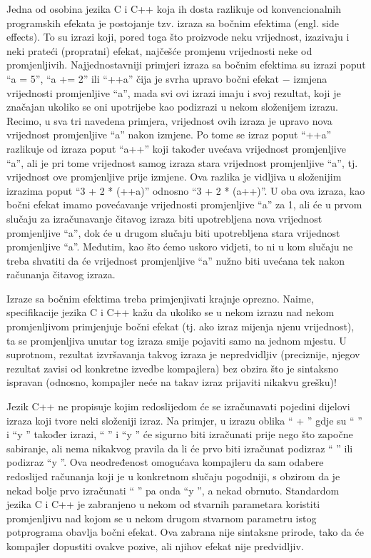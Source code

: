 \documentclass[11pt]{book}
\begin{document}
Jedna od osobina jezika C i C++ koja ih dosta razlikuje od konvencionalnih programskih efekata je postojanje tzv. izraza sa bočnim efektima (engl. side effects). To su izrazi koji, pored toga što proizvode neku vrijednost, izazivaju i neki prateći (propratni) efekat, najčešće promjenu vrijednosti neke od promjenljivih. Najjednostavniji primjeri izraza sa bočnim efektima su izrazi poput “a = 5”, “a += 2” ili “++a” čija je svrha upravo bočni efekat − izmjena vrijednosti promjenljive “a”, mada svi ovi izrazi imaju i svoj rezultat, koji je značajan ukoliko se oni upotrijebe kao podizrazi u nekom složenijem izrazu. Recimo, u sva tri navedena primjera, vrijednost ovih izraza je upravo nova vrijednost promjenljive “a” nakon izmjene. Po tome se izraz poput “++a” razlikuje od izraza poput “a++” koji također uvećava vrijednost promjenljive “a”, ali je pri tome vrijednost samog izraza stara vrijednost promjenljive “a”, tj. vrijednost ove promjenljive prije izmjene. Ova razlika je vidljiva u složenijim izrazima poput “3 + 2 * (++a)” odnosno “3 + 2 * (a++)”. U oba ova izraza, kao bočni efekat imamo povećavanje vrijednosti promjenljive “a” za 1, ali će u prvom slučaju za izračunavanje čitavog izraza biti upotrebljena nova vrijednost promjenljive “a”, dok će u drugom slučaju biti upotrebljena stara vrijednost promjenljive “a”. Međutim, kao što ćemo uskoro vidjeti, to ni u kom slučaju ne treba shvatiti da će vrijednost promjenljive “a” nužno biti uvećana tek nakon računanja čitavog izraza.

Izraze sa bočnim efektima treba primjenjivati krajnje oprezno. Naime, specifikacije jezika C i C++ kažu da ukoliko se u nekom izrazu nad nekom promjenljivom primjenjuje bočni efekat (tj. ako izraz mijenja njenu vrijednost), ta se promjenljiva unutar tog izraza smije pojaviti samo na jednom mjestu. U suprotnom, rezultat izvršavanja takvog izraza je nepredvidljiv (preciznije, njegov rezultat zavisi od konkretne izvedbe kompajlera) bez obzira što je sintaksno ispravan (odnosno, kompajler neće na takav izraz prijaviti nikakvu grešku)!

Jezik C++ ne propisuje kojim redoslijedom će se izračunavati pojedini dijelovi izraza koji tvore neki složeniji izraz. Na primjer, u izrazu oblika “ + ” gdje su “ ” i “y ” također izrazi, “ ” i “y ” će sigurno biti izračunati prije nego što započne sabiranje, ali nema nikakvog pravila da li će prvo biti izračunat podizraz “ ” ili podizraz “y ”. Ova neodređenost omogućava kompajleru da sam odabere redoslijed računanja koji je u konkretnom slučaju pogodniji, s obzirom da je nekad bolje prvo izračunati “ ” pa onda “y ”, a nekad obrnuto. Standardom jezika C i C++ je zabranjeno u nekom od stvarnih parametara koristiti promjenljivu nad kojom se u nekom drugom stvarnom parametru istog potprograma obavlja bočni efekat. Ova zabrana nije sintaksne prirode, tako da će kompajler dopustiti ovakve pozive, ali njihov efekat nije predvidljiv.
\end{document}
